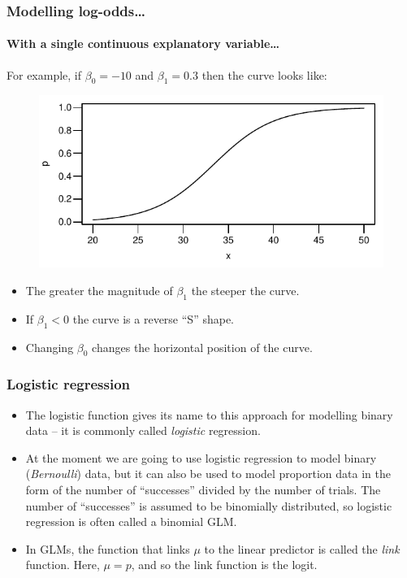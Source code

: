 \documentclass{beamer}\usepackage[]{graphicx}\usepackage[]{xcolor}
\begin{document}
\begin{frame}[fragile]
\frametitle{Modelling log-odds\ldots}
\framesubtitle{With a single continuous explanatory variable\ldots}
For example, 
if $\beta_0=-10$ and $\beta_1=0.3$ then the curve looks like:



\begin{figure}
  \centering
  \includegraphics{figure/RC-H15-002}
\end{figure}

\begin{itemize}
\item The greater the magnitude of $\beta_1$ the steeper the curve.\\
\item If $\beta_1<0$ the curve is a reverse ``S'' shape.\\
\item Changing $\beta_0$ changes the horizontal position of the curve.
\end{itemize}

\end{frame}


\begin{frame}
\frametitle{Logistic regression}
\begin{itemize}\setlength{\itemsep}{4mm}
\item The logistic function gives its name to this approach for modelling binary data -- it is commonly called \emph{logistic} regression. 
\item At the moment we are going to use logistic regression to model binary (\emph{Bernoulli}) data, 
but it can also be used to model proportion data in the form of the number of ``successes'' divided by the number of trials. The number of ``successes'' is assumed to be binomially distributed, so logistic regression is often called a binomial GLM. 
\item In GLMs, the function that links $\mu$ to the linear predictor is called the \emph{link} function. Here, $\mu=p$, and so the link function is the logit.
\end{itemize}

\end{frame}
\end{document}
